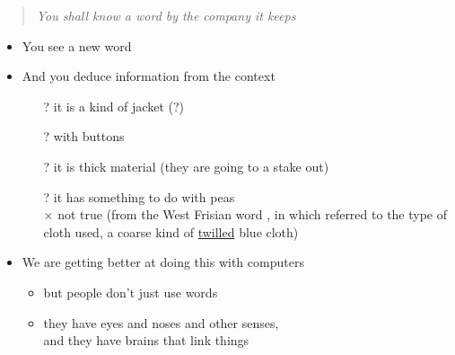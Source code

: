 \documentclass[a4paper,landscape,headrule,footrule,xetex]{foils}
\begin{document}
\begin{quote}
  \textit{You shall know a word by the company it keeps} \hfill
\citep[p11]{Firth:1957}
\end{quote}

\begin{itemize}
\item You see a new word 
\\ 
\item And you deduce information from the context

\begin{itemize}
\item[?] it is a kind of jacket \hfill(?)
\item[?] with buttons
\item [?] it is thick material (they are going to a stake out)
\item[?] it has something to do with peas \\ $\times$ not true (from the West
  Frisian word , in which  referred to the
  type of cloth used, a coarse kind of \ul{twilled} blue cloth)
\end{itemize}
\item We are getting better at doing this with computers
\begin{itemize}
\item but people don't just use words
\item they have eyes and noses and other senses, \\ and they have brains
  that link things
\end{itemize}

\end{itemize}

\end{document}
